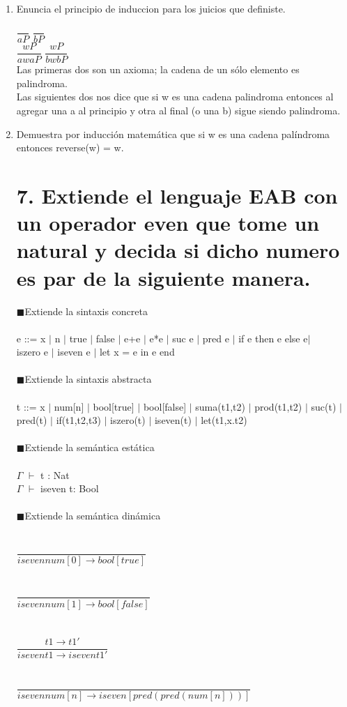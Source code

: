 \documentclass[11pt, a4paper]{report}
\begin{document}
  \begin{enumerate}[label=\alph*)]
  \item Enuncia el principio de induccion para los juicios que definiste. 
  
  $\dfrac{}{a P}$  $\dfrac{}{b P}$\\
  
$\dfrac{w P}{awa P}$  $\dfrac{w P}{bwb P}$\\

Las primeras dos son un axioma; la cadena de un s\'olo elemento es palindroma.\\
Las siguientes dos nos dice que si w es una cadena palindroma entonces al agregar una a al principio y otra al final (o una b) sigue siendo palindroma. 

  \item Demuestra por inducci\'on matem\'atica que si w es una cadena pal\'indroma entonces reverse(w) = w.
  
  \section*{7. Extiende el lenguaje EAB con un operador even que tome un natural y decida si dicho numero es par de la siguiente manera.}
$\blacksquare$Extiende la sintaxis concreta\\ \\
e ::= x	$|$ n $|$ true $|$ false $|$ e+e $|$ e*e $|$ suc e $|$ pred e $|$ if e then e else e$|$\\ iszero e $|$ iseven e $|$ let x = e in e end\\\\
$\blacksquare$Extiende la sintaxis abstracta\\\\
t ::= x 	$|$ num[n]	$|$ bool[true]	$|$ bool[false] 
		$|$ suma(t1,t2)	$|$ prod(t1,t2) 	$|$ suc(t) $|$ pred(t)
		$|$ if(t1,t2,t3) 	$|$ iszero(t) 	$|$ iseven(t)	$|$ let(t1,x.t2)\\\\
$\blacksquare$Extiende la sem\'antica est\'atica\\\\
$ \Gamma$ $\vdash$ t : Nat\\
$ \Gamma$ $\vdash$ iseven t: Bool\\\\
$\blacksquare$Extiende la sem\'antica din\'amica\\\\\\
$\dfrac{}{iseven num[0] \rightarrow bool[true]}$\\\\\\
$\dfrac{}{iseven num[1] \rightarrow bool[false]}$\\\\\\
$\dfrac{t1 \rightarrow t1'}{iseven t1 \rightarrow iseven  t1'}$\\\\\\
$\dfrac{}{iseven num[n] \rightarrow iseven[pred(pred(num[n]))]}$\\\\\\


\end{enumerate}
\end{document}
